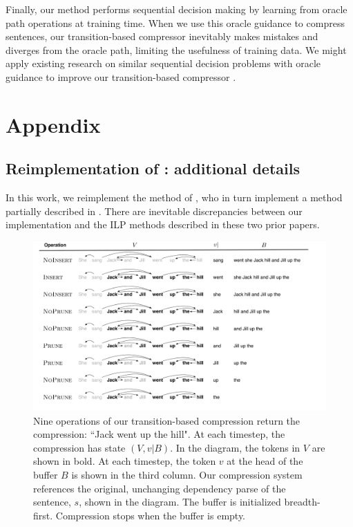 \documentclass[11pt,a4paper]{article}
\begin{document}
Finally, our method performs sequential decision making by learning from oracle path operations at training time. When we use this oracle guidance to compress sentences, our transition-based compressor inevitably makes mistakes and diverges from the oracle path, limiting the usefulness of training data. We might apply existing research on similar sequential decision problems with oracle guidance to improve our transition-based compressor \cite{Ross2011ARO}. 

\section{Appendix}

\subsection{Reimplementation of \citet{filippova2013overcoming}: additional details}

In this work, we reimplement the method of \citet{filippova2013overcoming}, who in turn implement a method partially described in \citet{filippova2008dependency}.  There are inevitable discrepancies between our implementation and the ILP methods described in these two prior papers.  

\begin{figure}[htb!]
\centering
\includegraphics[width=.75\textwidth]{worked.pdf}
\caption{Nine operations of our transition-based compression return the compression: ``Jack went up the hill". At each timestep, the compression has state $(V, v|B)$. In the diagram, the tokens in $V$ are shown in bold. At each timestep, the token $v$ at the head of the buffer $B$ is shown in the third column. Our compression system references the original, unchanging dependency parse of the sentence, $s$, shown in the diagram. The buffer is initialized breadth-first. Compression stops when the buffer is empty.}
\label{f:example}
\end{figure}
\end{document}
